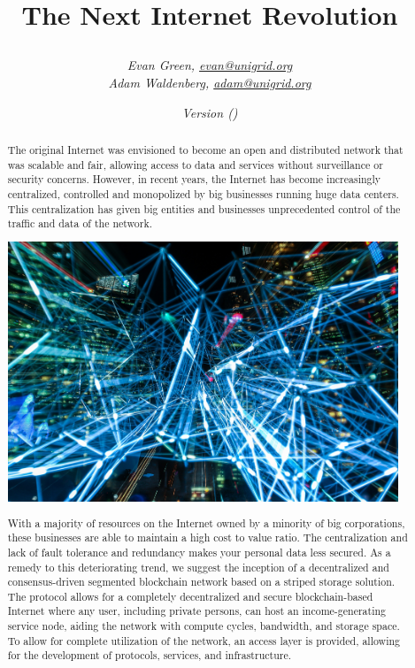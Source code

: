\documentclass[a4paper,oneside]{article}
\author{\textit{Evan Green, \href{mailto:evan@unigrid.org}{evan@unigrid.org}}\\
\textit{Adam Waldenberg, \href{mailto:adam@unigrid.org}{adam@unigrid.org}}}
\affil{The Unigrid Foundation}
\title{
	\makebox[\textwidth]{\hspace{600pt}\tikz \fill[orange] (18,1.4) rectangle (0,0);}
	\vspace{60pt}
	\begin{center}
		
	\end{center}
	\vspace{35pt}
	\textbf{The Next Internet Revolution}
	\vspace{10pt}
}
\date{\emph{Version \gitRel\hspace{5pt}(\gitCommitterDate)}}
\begin{document}
\clearpage\maketitle
\thispagestyle{empty}
\newpage
\vspace*{+34pt}
\begin{abstract}
\noindent The original Internet was envisioned to become an open and distributed network that was scalable and fair, allowing access to data and services without surveillance or security concerns. However, in recent years, the Internet has become increasingly centralized, controlled and monopolized by big businesses running huge data centers. This centralization has given big entities and businesses unprecedented control of the traffic and data of the network.

\begin{mdframed}[style=textimage]
	\includegraphics[width=331pt]{lights}
\end{mdframed}

\noindent With a majority of resources on the Internet owned by a minority of big corporations, these businesses are able to maintain a high cost to value ratio. The centralization and lack of fault tolerance and redundancy makes your personal data less secured. As a remedy to this deteriorating trend, we suggest the inception of a decentralized and consensus-driven segmented blockchain network based on a striped storage solution. The protocol allows for a completely decentralized and secure blockchain-based Internet where any user, including private persons, can host an income-generating service node, aiding the network with compute cycles, bandwidth, and storage space. To allow for complete utilization of the network, an access layer is provided, allowing for the development of protocols, services, and infrastructure.
\vspace*{+40pt}
\end{abstract}
\end{document}
